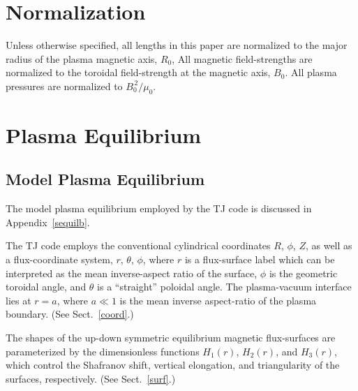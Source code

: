 \documentclass{iopjournal}
\begin{document}
\section{Normalization}\label{norm}
Unless otherwise specified, all lengths in this paper are normalized to  the major radius of the plasma magnetic axis, $R_0$, All  magnetic field-strengths
are normalized to the  toroidal field-strength at the magnetic axis, $B_0$. All plasma pressures are normalized to $B_0^{\,2}/\mu_0$.

\section{Plasma Equilibrium}\label{s2}
\subsection{Model Plasma Equilibrium}
The model plasma equilibrium employed by the TJ code is discussed in Appendix~\ref{sequilb}.

The TJ code employs the conventional cylindrical coordinates $R$, $\phi$, $Z$, as well as a flux-coordinate system, $r$, $\theta$, $\phi$, where $r$ is a flux-surface label which can be interpreted as the
mean inverse-aspect ratio of the surface, $\phi$ is the geometric toroidal angle, and $\theta$ is a ``straight'' poloidal angle. The plasma-vacuum
interface lies at $r=a$, where $a\ll 1$ is the mean inverse aspect-ratio of the plasma boundary. (See Sect.~\ref{coord}.)

 The shapes of the up-down symmetric equilibrium magnetic flux-surfaces are parameterized by the dimensionless functions
 $H_1(r)$, $H_2(r)$, and $H_3(r)$, which control the Shafranov shift, vertical elongation, and  triangularity of
the surfaces, respectively. (See Sect.~\ref{surf}.) 
\end{document}
